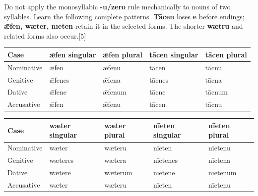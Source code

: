 Do not apply the monosyllabic \textbf{-u/\allowbreak{}zero} rule mechanically to nouns of two syllables. Learn the following complete patterns. \textbf{Tācen} loses \textbf{e} before endings; \textbf{ǣfen, wæter, nīeten} retain it in the selected forms. The shorter \textbf{wætru} and related forms also occur.[5]

\par\begingroup
\fontsize{10.5}{13.2}\selectfont
\setlength{\LTleft}{0pt}\setlength{\LTright}{\fill}
\noindent
\begin{tabular}{@{}>{\raggedright\arraybackslash}p{22.0mm}>{\raggedright\arraybackslash}p{22.688mm}>{\raggedright\arraybackslash}p{22.688mm}>{\raggedright\arraybackslash}p{22.688mm}>{\raggedright\arraybackslash}p{22.688mm}@{}}
\toprule
\textbf{Case} & \textbf{ǣfen singular} & \textbf{ǣfen plural} & \textbf{tācen singular} & \textbf{tācen plural} \\
\midrule
Nominative & ǣfen & ǣfenu & tācen & tācnu \\
Genitive & ǣfenes & ǣfena & tācnes & tācna \\
Dative & ǣfene & ǣfenum & tācne & tācnum \\
Accusative & ǣfen & ǣfenu & tācen & tācnu \\
\bottomrule
\end{tabular}
\par\endgroup

\par\begingroup
\fontsize{10.5}{13.2}\selectfont
\setlength{\LTleft}{0pt}\setlength{\LTright}{\fill}
\noindent
\begin{tabular}{@{}>{\raggedright\arraybackslash}p{22.0mm}>{\raggedright\arraybackslash}p{22.688mm}>{\raggedright\arraybackslash}p{22.688mm}>{\raggedright\arraybackslash}p{22.688mm}>{\raggedright\arraybackslash}p{22.688mm}@{}}
\toprule
\textbf{Case} & \textbf{wæter singular} & \textbf{wæter plural} & \textbf{nīeten singular} & \textbf{nīeten plural} \\
\midrule
Nominative & wæter & wæteru & nīeten & nīetenu \\
Genitive & wæteres & wætera & nīetenes & nīetena \\
Dative & wætere & wæterum & nīetene & nīetenum \\
Accusative & wæter & wæteru & nīeten & nīetenu \\
\bottomrule
\end{tabular}
\par\endgroup

